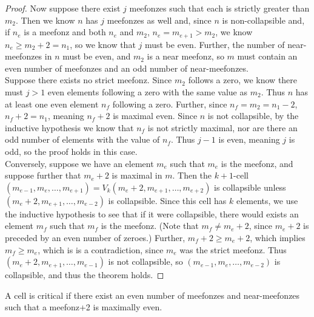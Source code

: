 \documentclass{amsart}
\begin{document}
\begin{proof}
	Now suppose there exist $j$ meefonzes such that each is strictly greater than $m_2$. Then we know $n$ has $j$ meefonzes as well and, since $n$ is non-collapsible and, if $n_e$ is a meefonz and both $n_e$ and $m_2$, $n_e=m_{e+1}>m_2$, we know $n_e \geq m_2+2=n_1$, so we know that $j$ must be even. Further, the number of near-meefonzes in $n$ must be even, and $m_2$ is a near meefonz, so $m$ must contain an even number of meefonzes and an odd number of near-meefonzes. \\
	Suppose there exists no strict meefonz. Since $m_2$ follows a zero, we know there must $j>1$ even elements following a zero with the same value as $m_2$. Thus $n$ has at least one even element $n_f$ following a zero. Further, since $n_f=m_2=n_1-2$, $n_f+2=n_1$, meaning $n_f+2$ is maximal even. Since $n$ is not collapsible, by the inductive hypothesis we know that $n_f$ is not strictly maximal, nor are there an odd number of elements with the value of $n_f$. Thus $j-1$ is even, meaning $j$ is odd, so the proof holds in this case.  \\
	Conversely, suppose we have an element $m_e$ such that $m_e$ is the meefonz, and suppose further that $m_e+2$ is maximal in $m$. Then the $k+1$-cell $(m_{e-1},m_e,\ldots,m_{e+1})=V_k(m_e+2,m_{e+1},\ldots,m_{e+2})$ is collapsible unless $(m_e+2,m_{e+1},\ldots,m_{e-2})$ is collapsible. Since this cell has $k$ elements, we use the inductive hypothesis to see that if it were collapsible, there would exists an element $m_f$ such that $m_f$ is the meefonz. (Note that $m_f \neq m_e+2$, since $m_e+2$ is preceded by an even number of zeroes.) Further, $m_f+2 \geq m_e+2$, which implies $m_f \geq m_e$, which is is a contradiction, since $m_e$ was the strict meefonz. Thus $(m_e+2,m_{e+1},\ldots,m_{e-1})$ is not collapsible, so $(m_{e-1},m_e,\ldots,m_{e-2})$ is collapsible, and thus the theorem holds.
\end{proof}
A cell is critical if there exist an even number of meefonzes and near-meefonzes such that a meefonz+2 is maximally even.
\end{document}
